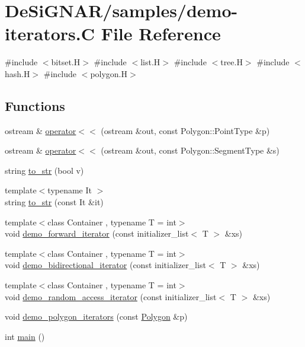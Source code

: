 \hypertarget{demo-iterators_8_c}{}\section{De\+Si\+G\+N\+A\+R/samples/demo-\/iterators.C File Reference}
\label{demo-iterators_8_c}
{\ttfamily \#include $<$bitset.\+H$>$}\newline
{\ttfamily \#include $<$list.\+H$>$}\newline
{\ttfamily \#include $<$tree.\+H$>$}\newline
{\ttfamily \#include $<$hash.\+H$>$}\newline
{\ttfamily \#include $<$polygon.\+H$>$}\newline
\subsection*{Functions}
\begin{DoxyCompactItemize}
\item 
ostream \& \hyperlink{demo-iterators_8_c_a923e96e2eb2a21cf7d668e804417c47a}{operator$<$$<$} (ostream \&out, const Polygon\+::\+Point\+Type \&p)
\item 
ostream \& \hyperlink{demo-iterators_8_c_aeeb3d06d99a03eacdce5a549712941cb}{operator$<$$<$} (ostream \&out, const Polygon\+::\+Segment\+Type \&s)
\item 
string \hyperlink{demo-iterators_8_c_af423c937ed0522544ed90c34b85d897e}{to\+\_\+str} (bool v)
\item 
{\footnotesize template$<$typename It $>$ }\\string \hyperlink{demo-iterators_8_c_af8bbc1c2b472077a39826f8635457c12}{to\+\_\+str} (const It \&it)
\item 
{\footnotesize template$<$class Container , typename T  = int$>$ }\\void \hyperlink{demo-iterators_8_c_a971180b8ea13c61009c451fe7a942839}{demo\+\_\+forward\+\_\+iterator} (const initializer\+\_\+list$<$ T $>$ \&xs)
\item 
{\footnotesize template$<$class Container , typename T  = int$>$ }\\void \hyperlink{demo-iterators_8_c_a26a099cedf4512aa8f05c2dd18e4b3d2}{demo\+\_\+bidirectional\+\_\+iterator} (const initializer\+\_\+list$<$ T $>$ \&xs)
\item 
{\footnotesize template$<$class Container , typename T  = int$>$ }\\void \hyperlink{demo-iterators_8_c_ad21d9d25e5563ab0ee7ebd1a3092b1df}{demo\+\_\+random\+\_\+access\+\_\+iterator} (const initializer\+\_\+list$<$ T $>$ \&xs)
\item 
void \hyperlink{demo-iterators_8_c_a17b3db72ea3737c300ed830ce644aba8}{demo\+\_\+polygon\+\_\+iterators} (const \hyperlink{class_designar_1_1_polygon}{Polygon} \&p)
\item 
int \hyperlink{demo-iterators_8_c_ae66f6b31b5ad750f1fe042a706a4e3d4}{main} ()
\end{DoxyCompactItemize}


